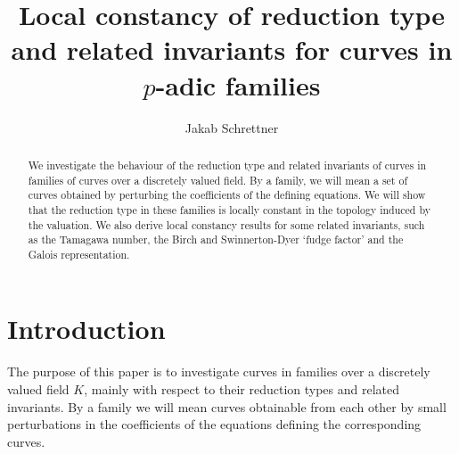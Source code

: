 \documentclass{article}
\title{Local constancy of reduction type and related invariants for curves in $p$-adic families}
\author{Jakab Schrettner}
\theoremstyle{definition}
\theoremstyle{plain}
\theoremstyle{remark}
\begin{document}
	\maketitle
	\begin{abstract}
		We investigate the behaviour of the reduction type and related invariants of curves in families of curves over a discretely valued field. By a family, we will mean a set of curves obtained by perturbing the coefficients of the defining equations. We will show that the reduction type in these families is locally constant in the topology induced by the valuation. We also derive local constancy results for some related invariants, such as the Tamagawa number, the Birch and Swinnerton-Dyer `fudge factor' and the Galois representation.
	\end{abstract}
	\tableofcontents
	\section{Introduction}
	The purpose of this paper is to investigate curves in families over a discretely valued field $K$, mainly with respect to their reduction types and related invariants. By a family we will mean curves obtainable from each other by small perturbations in the coefficients of the equations defining the corresponding curves. 
	
\end{document}
